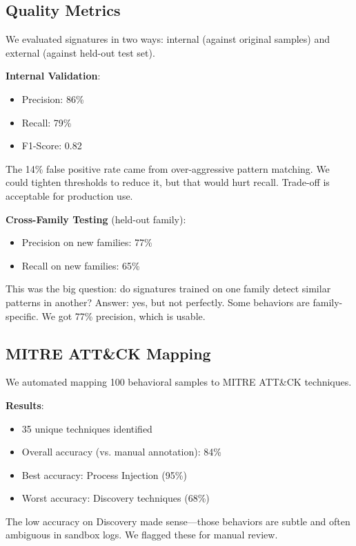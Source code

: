 \documentclass[11pt]{article}
\begin{document}
\subsection{Quality Metrics}

We evaluated signatures in two ways: internal (against original samples) and external (against held-out test set).

\textbf{Internal Validation}:
\begin{itemize}
    \item Precision: 86\%
    \item Recall: 79\%
    \item F1-Score: 0.82
\end{itemize}

The 14\% false positive rate came from over-aggressive pattern matching. We could tighten thresholds to reduce it, but that would hurt recall. Trade-off is acceptable for production use.

\textbf{Cross-Family Testing} (held-out family):
\begin{itemize}
    \item Precision on new families: 77\%
    \item Recall on new families: 65\%
\end{itemize}

This was the big question: do signatures trained on one family detect similar patterns in another? Answer: yes, but not perfectly. Some behaviors are family-specific. We got 77\% precision, which is usable.

\subsection{MITRE ATT\&CK Mapping}

We automated mapping 100 behavioral samples to MITRE ATT\&CK techniques. 

\textbf{Results}:
\begin{itemize}
    \item 35 unique techniques identified
    \item Overall accuracy (vs. manual annotation): 84\%
    \item Best accuracy: Process Injection (95\%)
    \item Worst accuracy: Discovery techniques (68\%)
\end{itemize}

The low accuracy on Discovery made sense—those behaviors are subtle and often ambiguous in sandbox logs. We flagged these for manual review.
\end{document}
